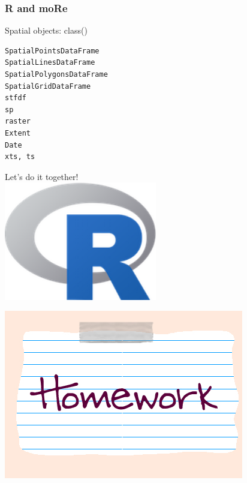 \documentclass{beamer}
\begin{document}

\begin{frame}[fragile]
\frametitle{R and moRe}
\begin{exampleblock}{Spatial objects: class()}
\begin{verbatim}
SpatialPointsDataFrame
SpatialLinesDataFrame
SpatialPolygonsDataFrame
SpatialGridDataFrame
stfdf
sp
raster
Extent
Date
xts, ts
\end{verbatim}
\end{exampleblock}
\end{frame}


\begin{frame}
\centering
\Huge{Let's do it together!}\\
\includegraphics[width=0.5\textwidth]{Figures/Rlogo.png}
\end{frame}


\begin{frame}
\centering
\includegraphics[width=\textwidth]{Figures/homework.png}
\end{frame}
\end{document}
